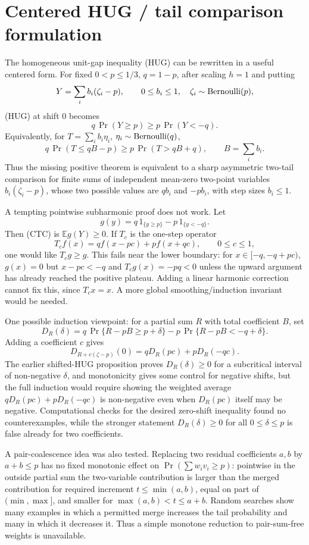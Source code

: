 \documentclass[12pt]{article}
\begin{document}
\section*{Centered HUG / tail comparison formulation}

The homogeneous unit-gap inequality (HUG) can be rewritten in a useful
centered form.  For fixed \(0<p\le 1/3\), \(q=1-p\), after scaling \(h=1\)
and putting
\[
    Y=\sum_i b_i(\zeta_i-p),\qquad 0\le b_i\le 1,\quad
    \zeta_i\sim{\rm Bernoulli}(p),
\]
(HUG) at shift \(0\) becomes
\[
    q\,\Pr(Y\ge p)\ge p\,\Pr(Y<-q). \tag{CTC}
\]
Equivalently, for \(T=\sum_i b_i\eta_i\), \(\eta_i\sim{\rm Bernoulli}(q)\),
\[
    q\,\Pr(T\le qB-p)\ge p\,\Pr(T>qB+q),\qquad B=\sum_i b_i.
\]
Thus the missing positive theorem is equivalent to a sharp asymmetric
two-tail comparison for finite sums of independent mean-zero two-point
variables \(b_i(\zeta_i-p)\), whose two possible values are \(q b_i\) and
\(-p b_i\), with step sizes \(b_i\le1\).

A tempting pointwise subharmonic proof does not work.  Let
\[
  g(y)=q\,1_{\{y\ge p\}}-p\,1_{\{y<-q\}}.
\]
Then (CTC) is \(\mathbb E g(Y)\ge0\).  If \(T_c\) is the one-step operator
\[
  T_c f(x)=q f(x-pc)+p f(x+qc),\qquad 0\le c\le1,
\]
one would like \(T_cg\ge g\).  This fails near the lower boundary:
for \(x\in[-q,-q+pc)\), \(g(x)=0\) but \(x-pc<-q\) and
\(T_cg(x)=-pq<0\) unless the upward argument has already reached the positive
plateau.  Adding a linear harmonic correction cannot fix this, since
\(T_c x=x\).  A more global smoothing/induction invariant would be needed.

One possible induction viewpoint: for a partial sum \(R\) with total coefficient
\(B\), set
\[
 D_R(\delta)=q\,\Pr\{R-pB\ge p+\delta\}
       -p\,\Pr\{R-pB<-q+\delta\}.
\]
Adding a coefficient \(c\) gives
\[
 D_{R+c(\zeta-p)}(0)=qD_R(pc)+pD_R(-qc).
\]
The earlier shifted-HUG proposition proves \(D_R(\delta)\ge0\) for a
subcritical interval of non-negative \(\delta\), and monotonicity gives some
control for negative shifts, but the full induction would require showing the
weighted average \(qD_R(pc)+pD_R(-qc)\) is non-negative even when
\(D_R(pc)\) itself may be negative.  Computational checks for the desired
zero-shift inequality found no counterexamples, while the stronger statement
\(D_R(\delta)\ge0\) for all \(0\le\delta\le p\) is false already for two
coefficients.

A pair-coalescence idea was also tested.  Replacing two residual coefficients
\(a,b\) by \(a+b\le p\) has no fixed monotonic effect on
\(\Pr(\sum w_i v_i\ge p)\): pointwise in the outside partial sum the
two-variable contribution is larger than the merged contribution for required
increment \(t\le\min(a,b)\), equal on part of \((\min,\max]\), and smaller for
\(\max(a,b)<t\le a+b\).  Random searches show many examples in which a
permitted merge increases the tail probability and many in which it decreases
it.  Thus a simple monotone reduction to pair-sum-free weights is unavailable.
\end{document}
